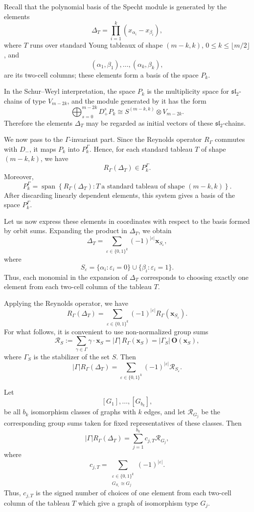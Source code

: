 \documentclass[12pt,reqno]{amsart}
\begin{document}
Recall that the polynomial basis of the Specht module is generated by the
elements
$$
\Delta_T
=
\prod_{i=1}^{k}(x_{\alpha_i}-x_{\beta_i}),
$$
where $T$ runs over standard Young tableaux of shape $(m-k,k)$,
$0\le k\le \lfloor m/2\rfloor$, and
$$
(\alpha_1,\beta_1),\dots,(\alpha_k,\beta_k),
$$
are its two-cell columns; these elements form a basis of the space $P_k$.

In the Schur--Weyl interpretation, the space $P_k$ is the multiplicity space
for $\mathfrak{sl}_2$-chains of type $V_{m-2k}$, and the module generated by
it has the form
$$
\bigoplus_{s=0}^{m-2k}D_+^sP_k
\cong
S^{(m-k,k)}\otimes V_{m-2k}.
$$
Therefore the elements $\Delta_T$ may be regarded as initial vectors of these
$\mathfrak{sl}_2$-chains.

We now pass to the $\Gamma$-invariant part. Since the Reynolds operator
$R_\Gamma$ commutes with $D_-$, it maps $P_k$ into $P_k^\Gamma$. Hence, for
each standard tableau $T$ of shape $(m-k,k)$, we have
$$
R_\Gamma(\Delta_T)\in P_k^\Gamma.
$$
Moreover,
$$
P_k^\Gamma
=
\operatorname{span}
\left\{
R_\Gamma(\Delta_T):
T\ \text{a standard tableau of shape }(m-k,k)
\right\}.
$$
After discarding linearly dependent elements, this system gives a basis of
the space $P_k^\Gamma$.

Let us now express these elements in coordinates with respect to the basis
formed by orbit sums. Expanding the product in $\Delta_T$, we obtain
$$
\Delta_T
=
\sum_{\varepsilon\in\{0,1\}^{k}}
(-1)^{|\varepsilon|}
\boldsymbol{x}_{S_\varepsilon},
$$
where
$$
S_\varepsilon
=
\{\alpha_i:\varepsilon_i=0\}
\cup
\{\beta_i:\varepsilon_i=1\}.
$$
Thus, each monomial in the expansion of $\Delta_T$ corresponds to choosing
exactly one element from each two-cell column of the tableau $T$.

Applying the Reynolds operator, we have
$$
R_\Gamma(\Delta_T)
=
\sum_{\varepsilon\in\{0,1\}^{k}}
(-1)^{|\varepsilon|}
R_\Gamma(\boldsymbol{x}_{S_\varepsilon}).
$$
For what follows, it is convenient to use non-normalized group sums
$$
\mathcal R_S
:=
\sum_{\gamma\in\Gamma}\gamma\cdot\boldsymbol{x}_S
=
|\Gamma|\,R_\Gamma(\boldsymbol{x}_S)
=
|\Gamma_S|\,\mathbf O(\boldsymbol{x}_S),
$$
where $\Gamma_S$ is the stabilizer of the set $S$. Then
$$
|\Gamma|R_\Gamma(\Delta_T)
=
\sum_{\varepsilon\in\{0,1\}^{k}}
(-1)^{|\varepsilon|}
\mathcal R_{S_\varepsilon}.
$$

Let
$$
[G_1],\dots,[G_{b_k}],
$$
be all $b_k$ isomorphism classes of graphs with $k$ edges, and let
$\mathcal R_{G_j}$ be the corresponding group sums taken for fixed
representatives of these classes. Then
$$
|\Gamma|R_\Gamma(\Delta_T)
=
\sum_{j=1}^{b_k} c_{j,T}\mathcal R_{G_j},
$$
where
$$
c_{j,T}
=
\sum_{\substack{\varepsilon\in\{0,1\}^{k}\\
G_{S_\varepsilon}\cong G_j}}
(-1)^{|\varepsilon|}.
$$
Thus, $c_{j,T}$ is the signed number of choices of one element from each
two-cell column of the tableau $T$ which give a graph of isomorphism type
$G_j$.
\end{document}

